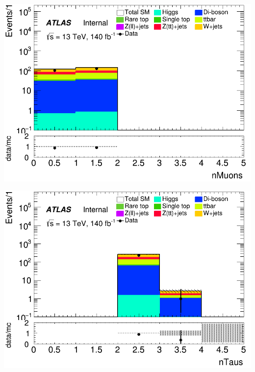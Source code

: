 \documentclass[usenames,dvipsnames]{beamer}
\begin{document}
\begin{frame}
    \begin{minipage}{0.32\textwidth}
        \centering
        \includegraphics[width=\textwidth]{graphics/LHH_met/LHH_met_nMuons.png}
    \end{minipage}
    \hfill
    \begin{minipage}{0.32\textwidth}
        \centering
        \includegraphics[width=\textwidth]{graphics/LHH_met/LHH_met_nTaus.png}
    \end{minipage}
    \hfill
    \begin{minipage}{0.32\textwidth}
        \centering

\end{minipage}
\end{frame}
\end{document}
